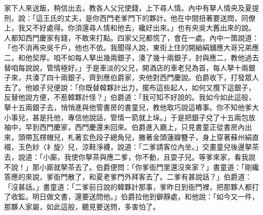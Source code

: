 \begin{showcontents}{}
家下人來送飯，稍信出去，教各人父兄使錢，上下尋人情。內中有拏人情央及夏提刑，說：「這王氏的丈夫，是你西門老爹門下的夥計。他在中間扭著要送問，同僚上，我又不好處得。你須還尋人情和他去，纔好出來。」也有央吳大舊出來的說。人都知西門慶家有錢，不敢來打點。四家父兄都慌了，會在一處。內中一箇說道：「也不消再央吳千戶，他也不依。我聞得人說，東街上住的開紬絹舖應大哥兄弟應二，和他契厚。咱不如每人拏出幾兩銀子，湊了幾十兩銀子，封與應二，教他過去替咱每說說，管情極好。」于是車淡的父兄，開酒店的車老兒為首，每人拏十兩銀子來，共湊了四十兩銀子，齊到應伯爵家，央他對西門慶說。伯爵收下，打發眾人去了。他娘子兒便說：「你既替韓夥計出力，擺布這些起人，如何又攬下這銀子，反替他說方便，不惹韓夥計怪？」伯爵道：「我可知不好說的。我如今如此這般，拏十五兩銀子去，悄悄進與他管書房的書童兒，教他取巧說這樁事。你不知他爹大小事兒，甚是托他，專信他說話，管情一箭就上垛。」于是把銀子兌了十五兩包放袖中，早到西門慶家，西門慶還未回來。伯爵進入廳上，只見書童正從書房內出來，頭帶瓦楞帽兒，札著玄色段子總角兒，撇著金頭蓮瓣簪子，身上穿著蘇州絹直裰，玉色紗〈衤旋〉兒，涼鞋淨襪，說道：「二爹請客位內坐。」交畫童兒後邊拏茶去，說道：「小廝，我使你拏茶與應二爹，你不動，且耍子兒。等爹來家，看我說不說！」那小廝就拏茶去了。伯爵便問：「你爹衙門里還沒來家？」書童道：「剛纔答應的來說，爹衙門散了，和夏老爹門外拜客去了。二爹有甚說話？」伯爵道：「沒甚話。」書童道：「二爹前日說的韓夥計那事，爹昨日到衙門裡，把那夥人都打了收監。明日做文書，還要送問他。」伯爵拉他到僻靜處，和他說：「如今又一件，那夥人家屬，如此這般，聽見要送問，多害怕了。


\end{showcontents}
